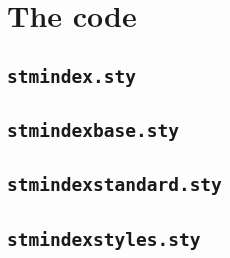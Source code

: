 \documentclass[%
  type=article,%
  layout=koma,%
  conditionallox=true,%
  conditionalloxnewpage=false,%
  date=true,%
  hyperref=true,%
  index=false,%
  listings=true%
]{stmtext}
\begin{document}
\printstmindex

\newpage
\appendix

\section{The code}

\subsection{\protect\texttt{stmindex.sty}}



\subsection{\protect\texttt{stmindexbase.sty}}



\subsection{\protect\texttt{stmindexstandard.sty}}



\subsection{\protect\texttt{stmindexstyles.sty}}


\end{document}
